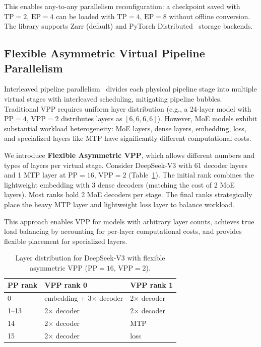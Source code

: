 \documentclass[10pt,logo,copyright]{nvidiatechreport}
\begin{document}
This enables any-to-any parallelism reconfiguration: a checkpoint saved with $\text{TP}=2$, $\text{EP}=4$ can be loaded with $\text{TP}=4$, $\text{EP}=8$ without offline conversion. The library supports Zarr (default) and PyTorch Distributed~\cite{zhao2023pytorchfsdp} storage backends.

\subsection{Flexible Asymmetric Virtual Pipeline Parallelism}\label{sec:flexible-vpp}

Interleaved pipeline parallelism~\cite{narayanan2021efficient} divides each physical pipeline stage into multiple virtual stages with interleaved scheduling, mitigating pipeline bubbles. Traditional VPP requires uniform layer distribution (e.g., a 24-layer model with $\text{PP}=4$, $\text{VPP}=2$ distributes layers as $[6, 6, 6, 6]$). However, MoE models exhibit substantial workload heterogeneity: MoE layers, dense layers, embedding, loss, and specialized layers like MTP have significantly different computational costs.

We introduce \textbf{Flexible Asymmetric VPP}, which allows different numbers and types of layers per virtual stage. Consider DeepSeek-V3 with 61 decoder layers and 1 MTP layer at $\text{PP}=16$, $\text{VPP}=2$ (Table~\ref{tab:flexible-vpp-example}). The initial rank combines the lightweight embedding with 3 dense decoders (matching the cost of 2 MoE layers). Most ranks hold 2 MoE decoders per stage. The final ranks strategically place the heavy MTP layer and lightweight loss layer to balance workload.

This approach enables VPP for models with arbitrary layer counts, achieves true load balancing by accounting for per-layer computational costs, and provides flexible placement for specialized layers.

\begin{table}[ht]
\centering
\caption{Layer distribution for DeepSeek-V3 with flexible asymmetric VPP ($\text{PP}=16$, $\text{VPP}=2$).}
\label{tab:flexible-vpp-example}
\begin{tabular}{lll}
\toprule
\textbf{PP rank} & \textbf{VPP rank 0} & \textbf{VPP rank 1} \\
\midrule
0       & embedding + 3$\times$ decoder & 2$\times$ decoder \\
1--13   & 2$\times$ decoder             & 2$\times$ decoder \\
14      & 2$\times$ decoder             & MTP \\
15      & 2$\times$ decoder             & loss \\
\bottomrule
\end{tabular}
\end{table}
\end{document}
